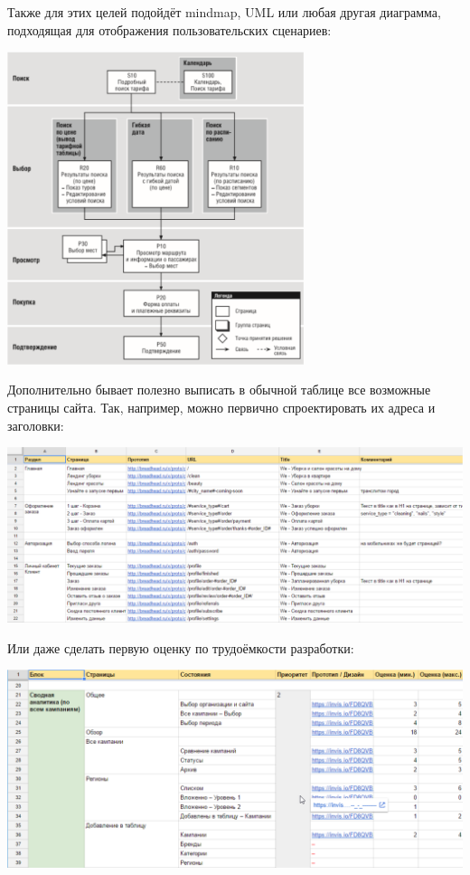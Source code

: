 \documentclass{../../text-style}
\begin{document}
Также для этих целей подойдёт mindmap, UML или любая другая диаграмма, подходящая для отображения пользовательских сценариев:

\begin{center}
    \includegraphics[width=0.65\textwidth]{userScenario.png}
\end{center}

Дополнительно бывает полезно выписать в обычной таблице все возможные страницы сайта. Так, например, можно первично спроектировать их адреса и заголовки:

\begin{center}
    \includegraphics[width=\textwidth]{tableView1.png}
\end{center}

Или даже сделать первую оценку по трудоёмкости разработки:

\begin{center}
    \includegraphics[width=\textwidth]{tableView2.png}
\end{center}
\end{document}

